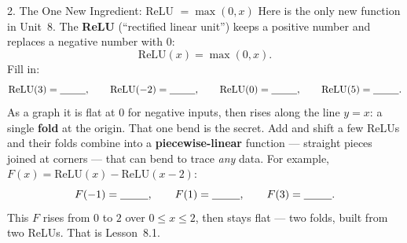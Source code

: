 \documentclass[10pt]{article}
\newcommand{\relu}{\mathrm{ReLU}}
\begin{document}
\begin{notesbox}{2. The One New Ingredient: ReLU $=\max(0,x)$}
Here is the only new function in Unit~8. The \textbf{ReLU} (``rectified linear unit'') keeps a positive
number and replaces a negative number with $0$:
\[
  \relu(x)=\max(0,x).
\]
Fill in:
\[
  \relu(3)=\blank{0.9cm},\qquad \relu(-2)=\blank{0.9cm},\qquad \relu(0)=\blank{0.9cm},\qquad \relu(5)=\blank{0.9cm}.
\]
As a graph it is flat at $0$ for negative inputs, then rises along the line $y=x$: a single \textbf{fold}
at the origin. That one bend is the secret. Add and shift a few ReLUs and their folds combine into a
\textbf{piecewise-linear} function --- straight pieces joined at corners --- that can bend to trace
\emph{any} data. For example, $F(x)=\relu(x)-\relu(x-2)$:
\[
  F(-1)=\blank{0.9cm},\qquad F(1)=\blank{0.9cm},\qquad F(3)=\blank{0.9cm}.
\]
This $F$ rises from $0$ to $2$ over $0\le x\le 2$, then stays flat --- two folds, built from two ReLUs.
That is Lesson~8.1.

\begin{center}
\end{center}
\end{notesbox}
\end{document}
